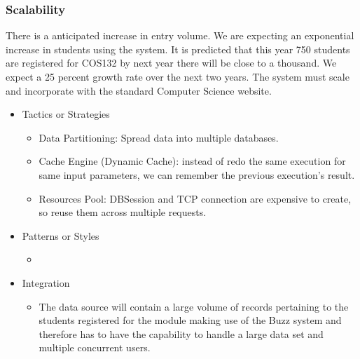 
%

\subsubsection{Scalability}
		There is a anticipated increase in entry volume. We are expecting an exponential increase in students using the system. It is predicted that this year 750 students are registered for COS132 by next year there will be close to a thousand. We expect a 25 percent growth rate over the next two years. 			\cite{classRepMeeting}
		The system must scale and incorporate with the standard Computer Science website. 
		\begin{itemize}
			\item{Tactics or Strategies}
				\begin{itemize}
					\item Data Partitioning: Spread data into multiple databases.
					\item Cache Engine (Dynamic Cache): instead of redo the same execution for same input parameters, we can remember the previous execution's result.
					\item Resources Pool: DBSession and TCP connection are expensive to create, so reuse them across multiple requests.
				\end{itemize}
			\item{Patterns or Styles}
				\begin{itemize}
					\item 
				\end{itemize}
			\item{Integration}
				\begin{itemize}
					\item The data source will contain a large volume of records pertaining to the students registered for the module making use of the Buzz system and therefore has to have the capability to handle a large data set and multiple concurrent users.
				\end{itemize}
		\end{itemize}
